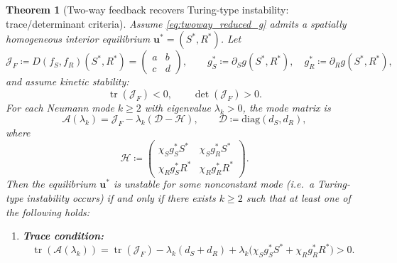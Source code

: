 \documentclass[10pt,a4paper]{amsart}
\newtheorem{theorem}{Theorem}
\begin{document}
\begin{theorem}[Two-way feedback recovers Turing-type instability: trace/determinant criteria]
\label{thm:twoway_criteria}
Assume \eqref{eq:twoway_reduced_g} admits a spatially homogeneous interior equilibrium $\mathbf{u}^*=(S^*,R^*)$.
Let
\[
\mathcal{J}_F \coloneqq D(f_S,f_R)(S^*,R^*)=
\begin{pmatrix}
a & b\\
c & d
\end{pmatrix},
\qquad
g_S^*\coloneqq \partial_S g(S^*,R^*),\quad g_R^*\coloneqq \partial_R g(S^*,R^*),
\]
and assume kinetic stability:
\begin{equation}
\label{eq:kinetic_stability_twoway}
\operatorname{tr}(\mathcal{J}_F)<0,\qquad \det(\mathcal{J}_F)>0.
\end{equation}
For each Neumann mode $k\ge2$ with eigenvalue $\lambda_k>0$, the mode matrix is
\[
\mathcal{A}(\lambda_k)=\mathcal{J}_F-\lambda_k(\mathcal{D}-\mathcal{H}),
\qquad
\mathcal{D}\coloneqq \mathrm{diag}(d_S,d_R),
\]
where
\[
\mathcal{H}\coloneqq
\begin{pmatrix}
\chi_S g_S^* S^* & \chi_S g_R^* S^*\\[4pt]
\chi_R g_S^* R^* & \chi_R g_R^* R^*
\end{pmatrix}.
\]
Then the equilibrium $\mathbf{u}^*$ is unstable for some nonconstant mode (i.e.\ a Turing-type instability occurs) if and only if
there exists $k\ge2$ such that at least one of the following holds:
\begin{enumerate}[label=(\alph*), leftmargin=*]
\item \textbf{Trace condition:}
\begin{equation}
\label{eq:twoway_trace_condition}
\operatorname{tr}(\mathcal{A}(\lambda_k))
=
\operatorname{tr}(\mathcal{J}_F)
-\lambda_k(d_S+d_R)
+\lambda_k\bigl(\chi_S g_S^* S^*+\chi_R g_R^* R^*\bigr)
>0.
\end{equation}


\end{enumerate}
\end{theorem}
\end{document}
